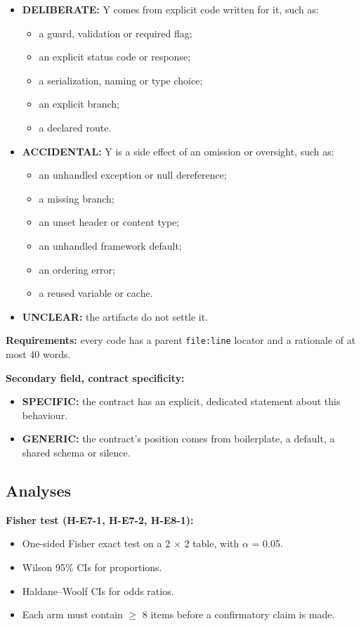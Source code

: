 \documentclass[acmsmall,screen,review,anonymous]{acmart}
\begin{document}
\begin{itemize}
\item \textbf{DELIBERATE:} Y comes from explicit code written for it, such as:
\begin{itemize}
\item a guard, validation or required flag;
\item an explicit status code or response;
\item a serialization, naming or type choice;
\item an explicit branch;
\item a declared route.
\end{itemize}
\item \textbf{ACCIDENTAL:} Y is a side effect of an omission or oversight, such as:
\begin{itemize}
\item an unhandled exception or null dereference;
\item a missing branch;
\item an unset header or content type;
\item an unhandled framework default;
\item an ordering error;
\item a reused variable or cache.
\end{itemize}
\item \textbf{UNCLEAR:} the artifacts do not settle it.
\end{itemize}

\textbf{Requirements:} every code has a parent \texttt{file:line} locator and a rationale of at most 40 words.

\textbf{Secondary field, contract specificity:}
\begin{itemize}
\item \textbf{SPECIFIC:} the contract has an explicit, dedicated statement about this behaviour.
\item \textbf{GENERIC:} the contract's position comes from boilerplate, a default, a shared schema or silence.
\end{itemize}

\subsection{Analyses}
\textbf{Fisher test (H-E7-1, H-E7-2, H-E8-1):}
\begin{itemize}
\item One-sided Fisher exact test on a 2 $\times$ 2 table, with $\alpha$ = 0.05.
\item Wilson 95\% CIs for proportions.
\item Haldane--Woolf CIs for odds ratios.
\item Each arm must contain $\geq$ 8 items before a confirmatory claim is made.
\end{itemize}
\end{document}
